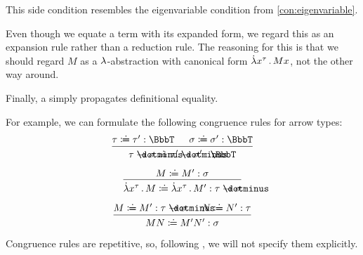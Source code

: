 \begin{remark}
\begin{thmenum}
\begin{thmenum}
      This side condition resembles the eigenvariable condition from \cref{con:eigenvariable}.

      Even though we equate a term with its expanded form, we regard this as an expansion rule rather than a reduction rule. The reasoning for this is that we should regard \( M \) as a \( {\mathrm \lambda} \)-abstraction with canonical form \( \qabs {x^\tau} M x \), not the other way around.

       Finally, a  simply propagates definitional equality.

      For example, we can formulate the following congruence rules for arrow types:
      \begin{equation*}
        \begin{prooftree}
          \hypo{ \tau \syndefeq \tau': \BbbT }
          \hypo{ \sigma \syndefeq \sigma': \BbbT }
          \infer2{ \tau \synimplies \sigma \syndefeq \tau' \synimplies \sigma': \BbbT }
        \end{prooftree}
      \end{equation*}

      \begin{paracol}{2}
        \begin{leftcolumn}
          \ParacolAlignmentHack
          \begin{equation*}
            \begin{prooftree}
              \hypo{ M \syndefeq M': \sigma }
              \infer1{ \qabs {x^{\tau}} M \syndefeq \qabs {x^{\tau}} M': \tau \synimplies \sigma }
            \end{prooftree}
          \end{equation*}
        \end{leftcolumn}

        \begin{rightcolumn}
          \ParacolAlignmentHack
          \begin{equation*}
            \begin{prooftree}
              \hypo{ M \syndefeq M': \tau \synimplies \sigma }
              \hypo{ N \syndefeq N': \tau }
              \infer2{ M N \syndefeq M' N': \sigma }
            \end{prooftree}
          \end{equation*}
        \end{rightcolumn}
      \end{paracol}
      \columnratio{}

      Congruence rules are repetitive, so, following \cite[\S A.2]{UnivalentFoundationsProgram2024OctoberHoTT}, we will not specify them explicitly.
    \end{thmenum}
  \end{thmenum}
\end{remark}
